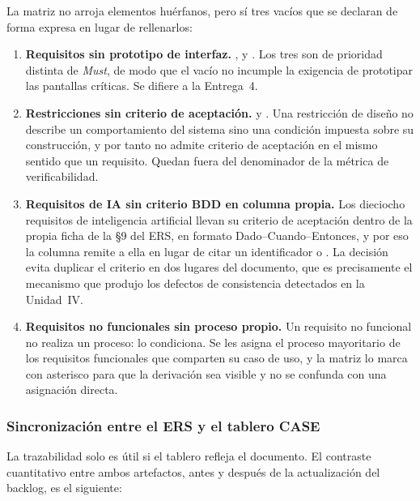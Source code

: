 \noindent
La matriz no arroja elementos huérfanos, pero sí tres vacíos que se declaran de forma expresa en
lugar de rellenarlos:

\begin{enumerate}[leftmargin=*, nosep]
  \item \textbf{Requisitos sin prototipo de interfaz.} ,  y . Los tres
        son de prioridad distinta de \emph{Must}, de modo que el vacío no incumple la exigencia de
        prototipar las pantallas críticas. Se difiere a la Entrega~4.
  \item \textbf{Restricciones sin criterio de aceptación.}  y . Una restricción
        de diseño no describe un comportamiento del sistema sino una condición impuesta sobre su
        construcción, y por tanto no admite criterio de aceptación en el mismo sentido que un
        requisito. Quedan fuera del denominador de la métrica de verificabilidad.
  \item \textbf{Requisitos de IA sin criterio BDD en columna propia.} Los dieciocho requisitos de
        inteligencia artificial llevan su criterio de aceptación dentro de la propia ficha de la \S9
        del ERS, en formato Dado--Cuando--Entonces, y por eso la columna remite a ella en lugar de
        citar un identificador  o . La decisión evita duplicar el criterio en dos
        lugares del documento, que es precisamente el mecanismo que produjo los defectos de
        consistencia detectados en la Unidad~IV.
  \item \textbf{Requisitos no funcionales sin proceso propio.} Un requisito no funcional no realiza
        un proceso: lo condiciona. Se les asigna el proceso mayoritario de los requisitos funcionales
        que comparten su caso de uso, y la matriz lo marca con asterisco para que la derivación sea
        visible y no se confunda con una asignación directa.
\end{enumerate}

\subsubsection*{Sincronización entre el ERS y el tablero CASE}

La trazabilidad solo es útil si el tablero refleja el documento. El contraste cuantitativo entre
ambos artefactos, antes y después de la actualización del backlog, es el siguiente:

